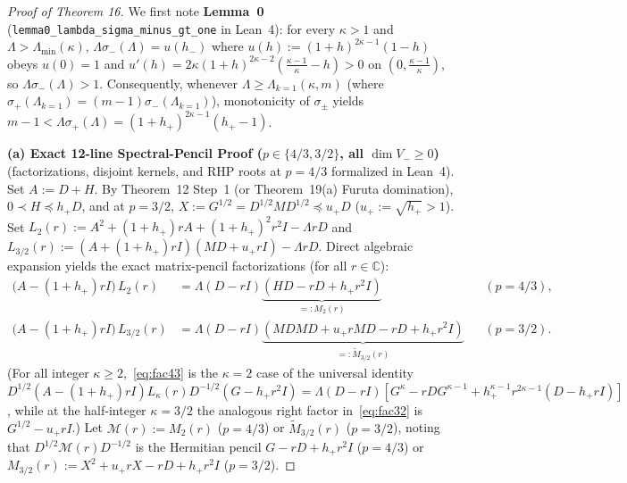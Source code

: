 \documentclass[10pt,letterpaper]{article}
\newcommand{\C}{\mathbb{C}}
\begin{document}
\begin{proof}[Proof of Theorem 16]
We first note \textbf{Lemma~0} (\texttt{lemma0\_lambda\_sigma\_minus\_gt\_one} in Lean~4): for every $\kappa > 1$ and $\Lambda > \Lambda_{\min}(\kappa)$, $\Lambda\sigma_-(\Lambda) = u(h_-)$ where $u(h) := (1+h)^{2\kappa-1}(1-h)$ obeys $u(0) = 1$ and $u'(h) = 2\kappa(1+h)^{2\kappa-2}(\frac{\kappa-1}{\kappa} - h) > 0$ on $(0, \frac{\kappa-1}{\kappa})$, so $\Lambda\sigma_-(\Lambda) > 1$. Consequently, whenever $\Lambda \ge \Lambda_{k=1}(\kappa, m)$ (where $\sigma_+(\Lambda_{k=1}) = (m-1)\sigma_-(\Lambda_{k=1})$), monotonicity of $\sigma_\pm$ yields $m - 1 < \Lambda\sigma_+(\Lambda) = (1+h_+)^{2\kappa-1}(h_+ - 1)$.

\textbf{(a) Exact 12-line Spectral-Pencil Proof ($p \in \{4/3, 3/2\}$, all $\dim V_- \ge 0$)} (factorizations, disjoint kernels, and RHP roots at $p = 4/3$ formalized in Lean~4).
Set $A := D + H$. By Theorem~12 Step~1 (or Theorem~19(a) Furuta domination), $0 \prec H \preceq h_+ D$, and at $p = 3/2$, $X := G^{1/2} = D^{1/2} M D^{1/2} \preceq u_+ D$ ($u_+ := \sqrt{h_+} > 1$). Set $L_2(r) := A^2 + (1+h_+)r A + (1+h_+)^2 r^2 I - \Lambda r D$ and $L_{3/2}(r) := (A + (1+h_+)rI)(MD + u_+ rI) - \Lambda r D$. Direct algebraic expansion yields the exact matrix-pencil factorizations (for all $r \in \C$):
\begin{align}
  \bigl(A - (1 + h_+)r I\bigr)\, L_2(r)
  &= \Lambda(D - r I)\underbrace{(H D - r D + h_+ r^2 I)}_{=: M_2(r)} && (p = 4/3), \label{eq:fac43}\\
  \bigl(A - (1 + h_+)r I\bigr)\, L_{3/2}(r)
  &= \Lambda(D - r I)\underbrace{(M D M D + u_+ r M D - r D + h_+ r^2 I)}_{=: \widetilde{M}_{3/2}(r)} && (p = 3/2). \label{eq:fac32}
\end{align}
(For all integer $\kappa \ge 2$,~\eqref{eq:fac43} is the $\kappa = 2$ case of the universal identity $D^{1/2}(A-(1+h_+)rI)L_\kappa(r)D^{-1/2}(G - h_+ r^2 I) = \Lambda(D - rI)[G^\kappa - rDG^{\kappa-1} + h_+^{\kappa-1} r^{2\kappa-1}(D - h_+ rI)]$, while at the half-integer $\kappa = 3/2$ the analogous right factor in~\eqref{eq:fac32} is $G^{1/2} - u_+ rI$.) Let $\mathcal{M}(r) := M_2(r)$ ($p = 4/3$) or $\widetilde{M}_{3/2}(r)$ ($p = 3/2$), noting that $D^{1/2}\mathcal{M}(r)D^{-1/2}$ is the Hermitian pencil $G - rD + h_+ r^2 I$ ($p = 4/3$) or $M_{3/2}(r) := X^2 + u_+ r X - r D + h_+ r^2 I$ ($p = 3/2$).


\end{proof}
\end{document}
